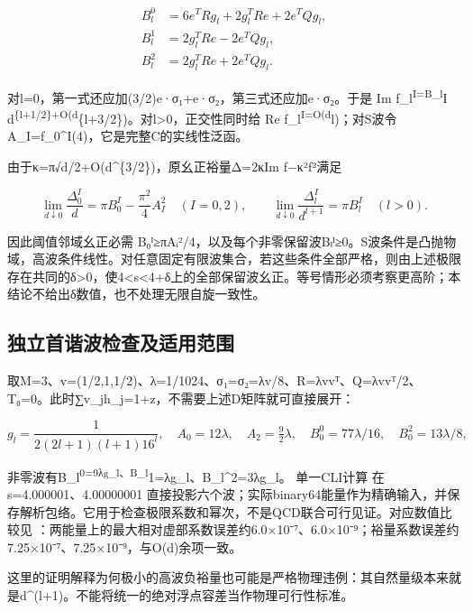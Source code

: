 \documentclass[
  10pt,
  a4paper,
]{article}
\begin{document}
\[
\begin{aligned}
B_l^0&=6e^TRg_l+2g_l^TRe+2e^TQg_l,\\
B_l^1&=2g_l^TRe-2e^TQg_l,\\
B_l^2&=2g_l^TRe+2e^TQg_l.
\end{aligned}
\]

对l=0，第一式还应加(3/2)e·σ₁+e·σ₂，第三式还应加e·σ₂。于是 Im
f\_l\textsuperscript{I=B\_l}I
d\textsuperscript{\{l+1/2\}+O(d}\{l+3/2\})。对l\textgreater0，正交性同时给
Re
f\_l\textsuperscript{I=O(d}l)；对S波令A\_I=f\_0\^{}I(4)，它是完整C的实线性泛函。

由于κ=π√d/2+O(d\^{}\{3/2\})，原幺正裕量Δ=2κIm
f−κ²\textbar f\textbar²满足

\[
\lim_{d\downarrow0}\frac{\Delta_0^I}{d}
=\pi B_0^I-\frac{\pi^2}{4}A_I^2\quad(I=0,2),
\qquad
\lim_{d\downarrow0}\frac{\Delta_l^I}{d^{l+1}}
=\pi B_l^I\quad(l>0).
\]

因此阈值邻域幺正必需
B₀ᴵ≥πAᵢ²/4，以及每个非零保留波Bₗᴵ≥0。S波条件是凸抛物域，高波条件线性。对任意固定有限波集合，若这些条件全部严格，则由上述极限存在共同的δ\textgreater0，使4\textless s\textless4+δ上的全部保留波幺正。等号情形必须考察更高阶；本结论不给出δ数值，也不处理无限自旋一致性。

\subsection{独立首谐波检查及适用范围}\label{ux72ecux7acbux9996ux8c10ux6ce2ux68c0ux67e5ux53caux9002ux7528ux8303ux56f4}

取M=3、v=(1/2,1,1/2)、λ=1/1024、σ₁=σ₂=λv/8、R=λvvᵀ、Q=λvvᵀ/2、T₀=0。此时∑v\_jh\_j=1+z，不需要上述D矩阵就可直接展开：

\[
g_l=\frac1{2(2l+1)(l+1)16^l},\quad
A_0=12\lambda,\quad A_2=\tfrac92\lambda,
\quad B_0^0=77\lambda/16,\quad B_0^2=13\lambda/8,
\]

非零波有B\_l\textsuperscript{0=9λg\_l、B\_l}1=λg\_l、B\_l\^{}2=3λg\_l。
单一CLI计算
在 s=4.000001、4.00000001
直接投影六个波；实际binary64能量作为精确输入，并保存解析包络。它用于检查极限系数和幂次，不是QCD联合可行见证。对应数值比较见
：两能量上的最大相对虚部系数误差约6.0×10⁻⁷、6.0×10⁻⁹；裕量系数误差约7.25×10⁻⁷、7.25×10⁻⁹，与O(d)余项一致。

这里的证明解释为何极小的高波负裕量也可能是严格物理违例：其自然量级本来就是d\^{}(l+1)。不能将统一的绝对浮点容差当作物理可行性标准。
\end{document}
